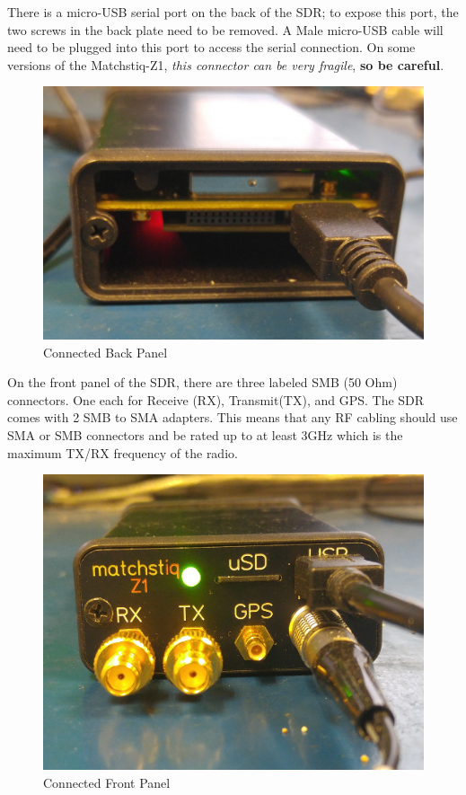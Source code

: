 \begin{flushleft}
There is a micro-USB serial port on the back of the SDR; to expose this port, the two screws in the back plate need to be removed.  A Male micro-USB cable will need to be plugged into this port to access the serial connection.  On some versions of the Matchstiq-Z1, \textit{this connector can be very fragile}, \textbf{so be careful}.\\ \bigskip

\begin{figure}[ht]
	\centerline{\includegraphics[scale=0.08]{Matchstiq_Z1_backpannel}}
	\caption{Connected Back Panel}
	\label{fig:back}
\end{figure}

On the front panel of the SDR, there are three labeled SMB (50 Ohm) connectors. One each for Receive (RX), Transmit(TX), and GPS.  The SDR comes with 2 SMB to SMA adapters.  This means that any RF cabling should use SMA or SMB connectors and be rated up to at least 3GHz which is the maximum TX/RX frequency of the radio. \\   \bigskip
\begin{figure}[ht]
	\centerline{\includegraphics[scale=0.1]{Matchstiq_Z1_frontpannel}}
	\caption{Connected Front Panel}
	\label{fig:front}
\end{figure}
\end{flushleft}

